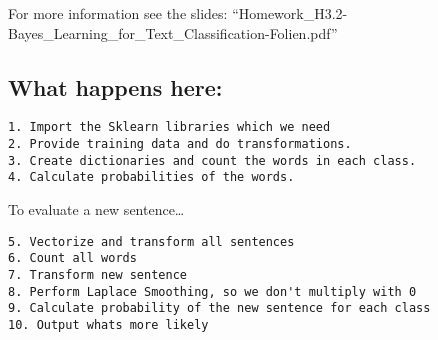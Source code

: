 \documentclass[11pt]{article}
\begin{document}
For more information see the slides:
``Homework\_H3.2-Bayes\_Learning\_for\_Text\_Classification-Folien.pdf''

\hypertarget{what-happens-here}{%
\subsection{What happens here:}\label{what-happens-here}}

\begin{verbatim}
1. Import the Sklearn libraries which we need
2. Provide training data and do transformations.
3. Create dictionaries and count the words in each class.
4. Calculate probabilities of the words.
\end{verbatim}

To evaluate a new sentence\ldots{}

\begin{verbatim}
5. Vectorize and transform all sentences
6. Count all words
7. Transform new sentence
8. Perform Laplace Smoothing, so we don't multiply with 0
9. Calculate probability of the new sentence for each class
10. Output whats more likely
\end{verbatim}
\end{document}
